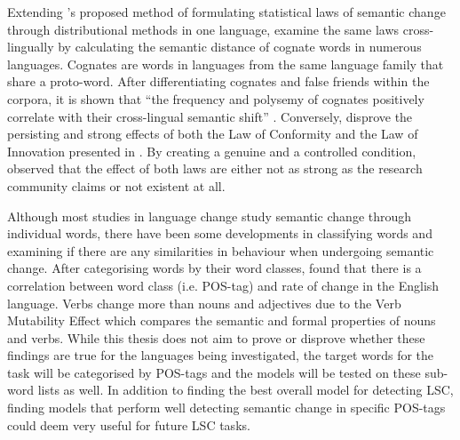 Extending \citet{hamilton-etal-2016-diachronic}’s proposed method of formulating statistical laws of semantic change through distributional methods in one language, \citet{uban-etal-2019-studying} examine the same laws cross-lingually by calculating the semantic distance of cognate words in numerous languages. Cognates are words in languages from the same language family that share a proto-word. After differentiating cognates and false friends within the corpora, it is shown that “the frequency and polysemy of cognates positively correlate with their cross-lingual semantic shift” \citep{uban-etal-2019-studying}. Conversely, \citet{dubossarsky-etal-2017-outta} disprove the persisting and strong effects of both the Law of Conformity and the Law of Innovation presented in \citet{hamilton-etal-2016-diachronic}. By creating a genuine and a controlled condition, \citet{dubossarsky-etal-2017-outta} observed that the effect of both laws are either not as strong as the research community claims or not existent at all.



Although most studies in language change study semantic change through individual words, there have been some developments in classifying words and examining if there are any similarities in behaviour when undergoing semantic change. After categorising words by their word classes, \citet{dubossarsky2018semantic} found that there is a correlation between word class (i.e. POS-tag) and rate of change in the English language. Verbs change more than nouns and adjectives due to the Verb Mutability Effect which compares the semantic and formal properties of nouns and verbs. While this thesis does not aim to prove or disprove whether these findings are true for the languages being investigated, the target words for the task will be categorised by POS-tags and the models will be tested on these sub-word lists as well. In addition to finding the best overall model for detecting LSC, finding models that perform well detecting semantic change in specific POS-tags could deem very useful for future LSC tasks. 


